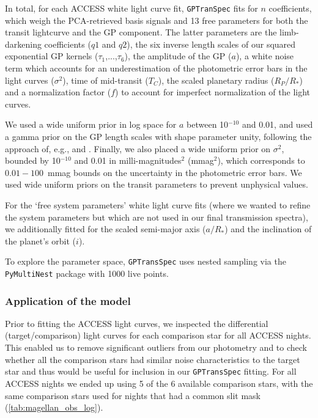 \documentclass[twocolumn]{aastex63}
\begin{document}
In total, for each ACCESS white light curve fit, \texttt{GPTranSpec} fits for $n$ coefficients, 
which weigh the PCA-retrieved basis signals and 13 free parameters for both the transit lightcurve 
and the GP component. The latter parameters are the limb-darkening coefficients ($q1$ and $q2$), the six inverse length scales of our squared exponential GP kernels ($\tau_1$,...,$\tau_6$), the amplitude of the GP ($a$), a white noise term which accounts for an underestimation of the photometric error bars in the light curves ($\sigma^2$), time of mid-transit ($T_C$), the scaled planetary radius ($R_P/R_*$) and a normalization factor ($f$) to account for imperfect normalization of the light curves.

We used a wide uniform prior in log space for $a$ between 10$^{-10}$ and 0.01, and used a gamma prior on the GP length scales with shape parameter unity, following the approach of, e.g., \cite{Gibson2012} and \cite{Evans2015}. Finally, we also placed a wide uniform prior on $\sigma^2$, bounded by 10$^{-10}$ and 0.01 in milli-magnitudes$^2$ (mmag$^2$), which corresponds to $0.01-100$\, mmag bounds on the uncertainty in the photometric error bars. We used wide uniform priors on the transit parameters to prevent unphysical values.

For the `free system parameters' white light curve fits (where we wanted to refine the system parameters but which are not used in our final transmission spectra), we additionally fitted for the scaled semi-major axis ($a/R_*$) and the inclination of the planet's orbit ($i$).

To explore the parameter space, \texttt{GPTransSpec} uses nested sampling via the \texttt{PyMultiNest} package \citep{Buchner2014} with 1000 live points.


\subsubsection{Application of the model}

Prior to fitting the ACCESS light curves, we inspected the differential (target/comparison) light curves for each comparison star for all ACCESS nights. This enabled us to remove significant outliers from our photometry and to check whether all the comparison stars had similar noise characteristics to the target star and thus would be useful for inclusion in our \texttt{GPTransSpec} fitting. For all ACCESS nights we ended up using 5 of the 6 available comparison stars, with the same comparison stars used for nights that had a common slit mask (\autoref{tab:magellan_obs_log}).
\end{document}
